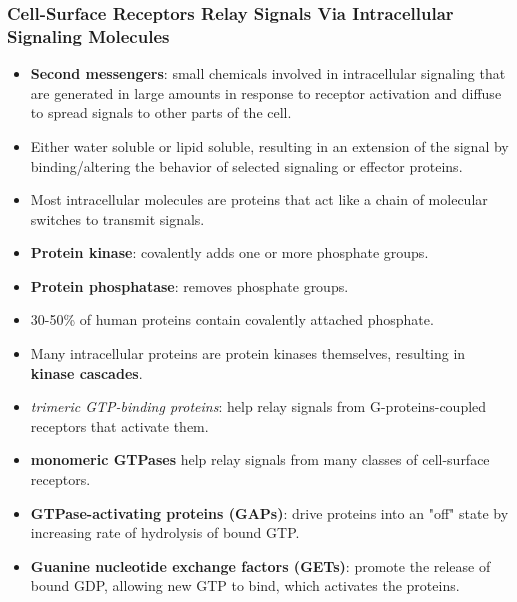 \documentclass[12pt,a4paper]{article}
\begin{document}
\subsubsection{Cell-Surface Receptors Relay Signals Via Intracellular Signaling Molecules}
\begin{itemize}
    \item \textbf{Second messengers}: small chemicals involved in intracellular signaling that are generated in large amounts in response to receptor activation and diffuse to spread signals to other parts of the cell.
    \item Either water soluble or lipid soluble, resulting in an extension of the signal by binding/altering the behavior of selected signaling or effector proteins.
    \item Most intracellular molecules are proteins that act like a chain of molecular switches to transmit signals.
    \item \textbf{Protein kinase}: covalently adds one or more phosphate groups.
    \item \textbf{Protein phosphatase}: removes phosphate groups.
    \item 30-50\% of human proteins contain covalently attached phosphate.
    \item Many intracellular proteins are protein kinases themselves, resulting in \textbf{kinase cascades}.
    \item \textit{trimeric GTP-binding proteins}: help relay signals from G-proteins-coupled receptors that activate them.
    \item \textbf{monomeric GTPases} help relay signals from many classes of cell-surface receptors.
    \item \textbf{GTPase-activating proteins (GAPs)}: drive proteins into an "off" state by increasing rate of hydrolysis of bound GTP. 
    \item \textbf{Guanine nucleotide exchange factors (GETs)}: promote the release of bound GDP, allowing new GTP to bind, which activates the proteins.
\end{itemize}
\end{document}
